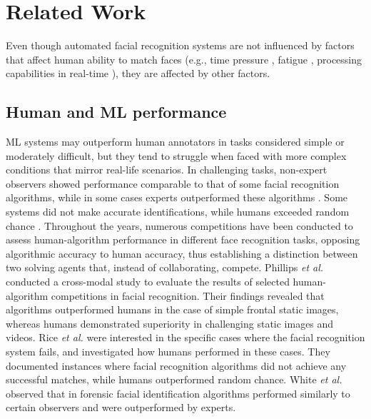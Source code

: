 \section{Related Work}
\label{sec:related}

Even though automated facial recognition systems are not influenced by factors that affect human ability to match faces (e.g., time pressure \cite{fysh2017effects}, fatigue \cite{behrens2023fatigue}, processing capabilities in real-time \cite{curry2003capability}), they are affected by other factors. %

\subsection{Human and ML performance}

ML systems may outperform human annotators in tasks considered simple or moderately difficult, but they tend to struggle when faced with more complex conditions that mirror real-life scenarios. In challenging tasks, non-expert observers showed performance comparable to that of some facial recognition algorithms, while in some cases experts outperformed these algorithms \cite{white2015perceptual}. Some systems did not make accurate identifications, while humans exceeded random chance \cite{rice2013unaware}.
%
Throughout the years, numerous competitions have been conducted to assess human-algorithm performance in different face recognition tasks, opposing algorithmic accuracy to human accuracy, thus establishing a distinction between two solving agents that, instead of collaborating, compete. Phillips {\em et al.} \cite{phillips2014comparison} conducted a cross-modal study to evaluate the results of selected human-algorithm competitions in facial recognition. Their findings revealed that algorithms outperformed humans in the case of simple frontal static images, whereas humans demonstrated superiority in challenging static images and videos.
Rice {\em et al.} \cite{rice2013unaware} were interested in the specific cases where the facial recognition system fails, and investigated how humans performed in these cases. They documented instances where facial recognition algorithms did not achieve any successful matches, while humans outperformed random chance. White {\em et al.} \cite{white2015perceptual} observed that in forensic facial identification algorithms performed similarly to certain observers and were outperformed by experts. 

